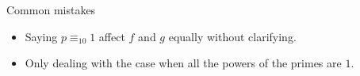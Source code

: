\documentclass[12pt]{article}
\begin{document}
\begin{enumerate}[topsep=\bigskipamount,itemsep=\bigskipamount,leftmargin=0pt]
Common mistakes
\begin{itemize}
\item Saying $p\equiv_{10} 1$ affect $f$ and $g$ equally without clarifying.
\item Only dealing with the case when all the powers of the primes are $1$.
\end{itemize}

\end{enumerate}
\end{document}
